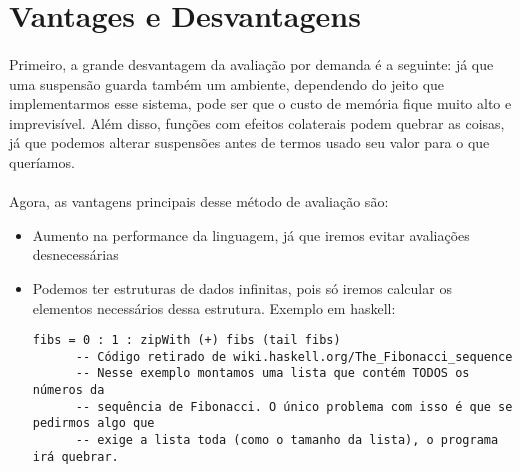 \documentclass[11pt]{article}
\begin{document}
\section{Vantages e Desvantagens}
\label{sec:orge285622}
\paragraph{} Primeiro, a grande desvantagem da avaliação por demanda é a seguinte: já que uma suspensão guarda também um ambiente,
dependendo do jeito que implementarmos esse sistema, pode ser que o custo de memória fique muito alto e imprevisível. Além disso, funções
com efeitos colaterais podem quebrar as coisas, já que podemos alterar suspensões antes de termos usado seu valor para o que queríamos.

\paragraph{} Agora, as vantagens principais desse método de avaliação são:

\begin{itemize}
\item Aumento na performance da linguagem, já que iremos evitar avaliações desnecessárias
\item Podemos ter estruturas de dados infinitas, pois só iremos calcular os elementos necessários dessa estrutura. Exemplo em haskell:
\begin{verbatim}
fibs = 0 : 1 : zipWith (+) fibs (tail fibs)
      -- Código retirado de wiki.haskell.org/The_Fibonacci_sequence
      -- Nesse exemplo montamos uma lista que contém TODOS os números da
      -- sequência de Fibonacci. O único problema com isso é que se pedirmos algo que
      -- exige a lista toda (como o tamanho da lista), o programa irá quebrar.
\end{verbatim}
\end{itemize}
\end{document}
